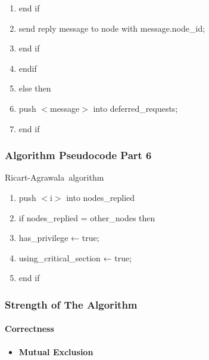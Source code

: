 \documentclass[11pt]{beamer}              %
\begin{document}
\begin{frame}
\begin{center}
\begin{algorithm}[H]
\begin{algorithmic}[1]
\begin{enumerate}
                \item \quad \quad \quad end if
                \item \quad \quad \quad send reply message to node with message.node\_id;
                \item \quad \quad end if
                \item \quad endif
                \item else then
                \item \quad push $<$message$>$ into deferred\_requests;
                \item end if
            \end{enumerate}
    \end{algorithmic}
\end{algorithm}
\end{center}
\end{frame}

\begin{frame}
\frametitle{Algorithm Pseudocode Part 6}

\begin{center}
\begin{algorithm}[H]
	\scriptsize
	\def\algorithmlabel{Ricart-Agrawala}
    \caption{\algorithmlabel\ algorithm}
    \label{alg:ricart_agrawala}
    \begin{algorithmic}[1]
            \begin{enumerate}
                \item push $<$i$>$ into nodes\_replied
                \item if nodes\_replied = other\_nodes then
                \item \quad has\_privilege ← true;
                \item \quad using\_critical\_section ← true;
                \item end if
            \end{enumerate}

    \end{algorithmic}
\end{algorithm}
\end{center}
\end{frame}

\begin{frame}
\frametitle{Strength of The Algorithm}
\framesubtitle{Correctness}
\begin{itemize}
    \item \textbf{Mutual Exclusion}
\end{itemize}
\end{frame}
\end{document}
